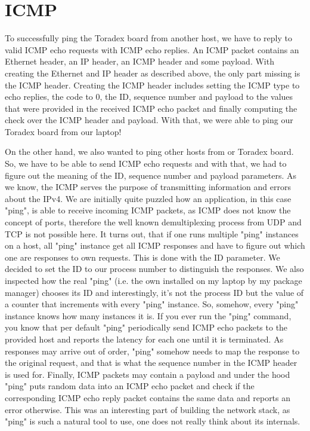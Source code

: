 \section{ICMP}

To successfully ping the Toradex board from another host, we have to reply to
valid ICMP echo requests with ICMP echo replies. An ICMP packet contains an
Ethernet header, an IP header, an ICMP header and some payload. With creating
the Ethernet and IP header as described above, the only part missing is the ICMP
header. Creating the ICMP header includes setting the ICMP type to echo replies,
the code to 0, the ID, sequence number and payload to the values that were
provided in the received ICMP echo packet and finally computing the check over
the ICMP header and payload. With that, we were able to ping our Toradex board
from our laptop!

On the other hand, we also wanted to ping other hosts from or Toradex board. So,
we have to be able to send ICMP echo requests and with that, we had to figure
out the meaning of the ID, sequence number and payload parameters.  As we know,
the ICMP serves the purpose of transmitting information and errors about the
IPv4. We are initially quite puzzled how an application, in this case "ping", is
able to receive incoming ICMP packets, as ICMP does not know the concept of
ports, therefore the well known demultiplexing process from UDP and TCP is not
possible here.  It turns out, that if one runs multiple "ping" instances on a
host, all "ping" instance get all ICMP responses and have to figure out which
one are responses to own requests. This is done with the ID parameter. We
decided to set the ID to our process number to distinguish the responses. We
also inspected how the real "ping" (i.e. the own installed on my laptop by my
package manager) chooses its ID and interestingly, it's not the process ID but
the value of a counter that increments with every "ping" instance. So, somehow,
every "ping" instance knows how many instances it is.  If you ever run the
"ping" command, you know that per default "ping" periodically send ICMP echo
packets to the provided host and reports the latency for each one until it is
terminated. As responses may arrive out of order, "ping" somehow needs to map
the response to the original request, and that is what the sequence number in
the ICMP header is used for.  Finally, ICMP packets may contain a payload and
under the hood "ping" puts random data into an ICMP echo packet and check if the
corresponding ICMP echo reply packet contains the same data and reports an error
otherwise.  This was an interesting part of building the network stack, as
"ping" is such a natural tool to use, one does not really think about its
internals.

